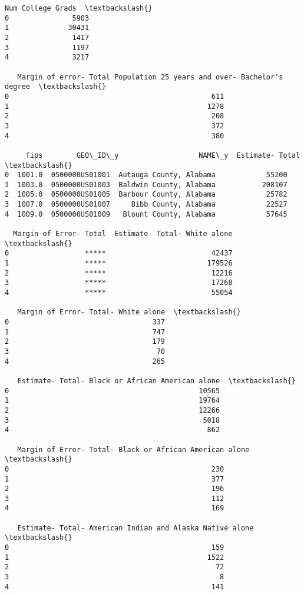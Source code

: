 \documentclass[11pt]{article}
\begin{document}
\begin{tcolorbox}[breakable, size=fbox, boxrule=.5pt, pad at break*=1mm, opacityfill=0]
\begin{Verbatim}[commandchars=\\\{\}]
   Num College Grads  \textbackslash{}
0               5903
1              30431
2               1417
3               1197
4               3217

   Margin of error- Total Population 25 years and over- Bachelor's degree  \textbackslash{}
0                                                611
1                                               1278
2                                                208
3                                                372
4                                                380

     fips        GEO\_ID\_y                   NAME\_y  Estimate- Total  \textbackslash{}
0  1001.0  0500000US01001  Autauga County, Alabama            55200
1  1003.0  0500000US01003  Baldwin County, Alabama           208107
2  1005.0  0500000US01005  Barbour County, Alabama            25782
3  1007.0  0500000US01007     Bibb County, Alabama            22527
4  1009.0  0500000US01009   Blount County, Alabama            57645

  Margin of Error- Total  Estimate- Total- White alone  \textbackslash{}
0                  *****                         42437
1                  *****                        179526
2                  *****                         12216
3                  *****                         17268
4                  *****                         55054

   Margin of Error- Total- White alone  \textbackslash{}
0                                  337
1                                  747
2                                  179
3                                   70
4                                  265

   Estimate- Total- Black or African American alone  \textbackslash{}
0                                             10565
1                                             19764
2                                             12266
3                                              5018
4                                               862

   Margin of Error- Total- Black or African American alone  \textbackslash{}
0                                                230
1                                                377
2                                                196
3                                                112
4                                                169

   Estimate- Total- American Indian and Alaska Native alone  \textbackslash{}
0                                                159
1                                               1522
2                                                 72
3                                                  8
4                                                141


\end{Verbatim}
\end{tcolorbox}
\end{document}
